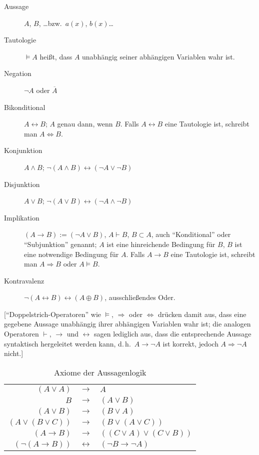 \begin{description}
    \item[Aussage] $A$, $B$, \ldots bzw.~$a(x)$, $b(x)$\ldots
    \item[Tautologie] $\models A$ heißt, dass $A$ unabhängig seiner abhängigen Variablen wahr ist.
    \item[Negation] $\neg A$ oder $\overline{A}$
    \item[Bikonditional] $A \leftrightarrow B$; $A$ genau dann, wenn $B$. Falls $A \leftrightarrow B$ eine Tautologie ist,
                         schreibt man $A \Leftrightarrow B$.
    \item[Konjunktion] $A \land B$; $\neg(A \land B) \leftrightarrow (\neg A \lor \neg B)$
    \item[Disjunktion] $A \lor B$; $\neg(A \lor B) \leftrightarrow (\neg A \land \neg B)$
    \item[Implikation] $(A \rightarrow B) := (\neg A \lor B)$, $A \vdash B$, $B \subset A$, auch
                       \enquote{Konditional} oder \enquote{Subjunktion} genannt; $A$ ist eine hinreichende
                       Bedingung für $B$, $B$ ist eine notwendige Bedingung für $A$. Falls $A \rightarrow B$ eine Tautologie
                       ist, schreibt man $A \Rightarrow B$ oder $A \models B$.
    \item[Kontravalenz] $\neg(A \leftrightarrow B) \leftrightarrow (A \oplus B)$, ausschließendes Oder.
\end{description}

[\enquote{Doppelstrich-Operatoren} wie $\models$, $\Rightarrow$ oder $\Leftrightarrow$ drücken damit aus, dass eine gegebene
Aussage unabhängig ihrer abhängigen Variablen wahr ist; die analogen Operatoren $\vdash$, $\rightarrow$ und $\leftrightarrow$ sagen lediglich aus, dass die entsprechende Aussage syntaktisch hergeleitet werden kann, d.\,h.~$A \rightarrow \neg A$ ist korrekt, jedoch $A \Rightarrow \neg A$ nicht.]


\begin{table}[htb]
    \centering\begin{tabular}{rcl}
    	             $(A \lor A)$ &   $\rightarrow$   & $A$                            \\
    	                      $B$ &   $\rightarrow$   & $(A \lor B)$                   \\
    	             $(A \lor B)$ &   $\rightarrow$   & $(B \lor A)$                   \\
    	    $(A \lor (B \lor C))$ &   $\rightarrow$   & $(B \lor (A \lor C))$          \\
    	      $(A \rightarrow B)$ &   $\rightarrow$   & $((C \lor A) \lor (C \lor B))$ \\
    	$(\neg(A \rightarrow B))$ & $\leftrightarrow$ & $(\neg B \rightarrow \neg A)$
    \end{tabular}
    \caption{Axiome der Aussagenlogik}
\end{table}
